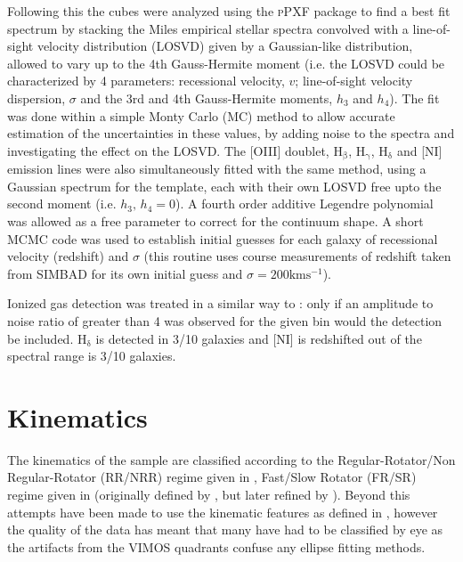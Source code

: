 \documentclass[fleqn,usenatbib,useAMS]{mnras}
\begin{document}
		Following this the cubes were analyzed using the \textsc{pPXF} package \citep{Cappellari2004} to find a best fit spectrum by stacking the Miles empirical stellar spectra \citep{Sanchez-Blazquez2006} convolved with a line-of-sight velocity distribution (LOSVD) given by a Gaussian-like distribution, allowed to vary up to the 4th Gauss-Hermite moment (i.e. the LOSVD could be characterized by 4 parameters: recessional velocity, $v$; line-of-sight velocity dispersion, $\sigma$ and the 3rd and 4th Gauss-Hermite moments, $h_3$ and $h_4$). The fit was done within a simple Monty Carlo (MC) method to allow accurate estimation of the uncertainties in these values, by adding noise to the spectra and investigating the effect on the LOSVD. The [OIII] doublet, H$_\mathrm{\beta}$, H$_\mathrm{\gamma}$, H$_\mathrm{\delta}$ and [NI] emission lines were also simultaneously fitted with the same method, using a Gaussian spectrum for the template, each with their own LOSVD free upto the second moment (i.e. $h_3, \, h_4 = 0$). A fourth order additive Legendre polynomial was allowed as a free parameter to correct for the continuum shape. A short MCMC code was used to establish initial guesses for each galaxy of recessional velocity (redshift) and $\sigma$ (this routine uses course measurements of redshift taken from SIMBAD \citep{Wenger2000} for its own initial guess and $\sigma = 200 \mathrm{km s^{-1}}$).

		Ionized gas detection was treated in a similar way to \citet{Sarzi2005}: only if an amplitude to noise ratio of greater than 4 was observed for the given bin would the detection be included. H$_\mathrm{\delta}$ is detected in 3/10 galaxies and [NI] is redshifted out of the spectral range is 3/10 galaxies.



\section{Kinematics}
	\label{sec:kine}
	The kinematics of the sample are classified according to the Regular-Rotator/Non Regular-Rotator (RR/NRR) regime given in \citet{Krajnovic2011}, Fast/Slow Rotator (FR/SR) regime given in \citet{Cappellari2016} (originally defined by \citet{Emsellem2011}, but later refined by \citet{Cappellari2016}). Beyond this attempts have been made to use the kinematic features as defined in \citet{Krajnovic2011}, however the quality of the data has meant that many have had to be classified by eye as the artifacts from the VIMOS quadrants confuse any ellipse fitting methods. 
\end{document}

